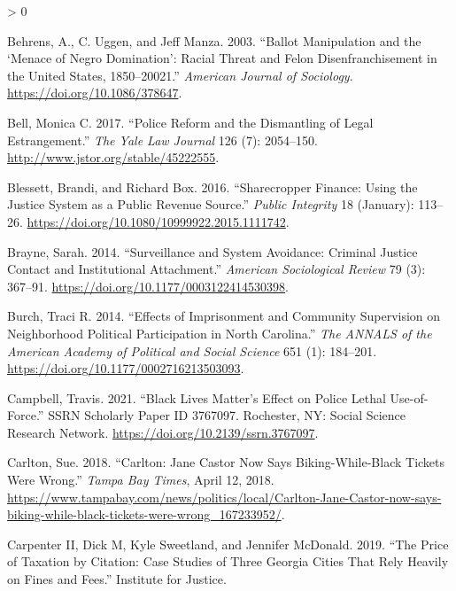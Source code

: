 \documentclass[
  12pt,
]{article}
\newlength{\cslhangindent}
\newenvironment{CSLReferences}[2] %
 {%
  \setlength{\parindent}{0pt}
  \ifodd #1 \everypar{\setlength{\hangindent}{\cslhangindent}}\ignorespaces\fi
  \ifnum #2 > 0
  \setlength{\parskip}{#2\baselineskip}
  \fi
 }%
 {}
\begin{document}
\hypertarget{refs}{}
\begin{CSLReferences}{1}{0}
\leavevmode\hypertarget{ref-Behrens2003}{}%
Behrens, A., C. Uggen, and Jeff Manza. 2003. {``Ballot {Manipulation} and the {`{Menace} of {Negro Domination}'}: {Racial Threat} and {Felon Disenfranchisement} in the {United States}, 1850--20021.''} \emph{American Journal of Sociology}. \url{https://doi.org/10.1086/378647}.

\leavevmode\hypertarget{ref-Bell2017}{}%
Bell, Monica C. 2017. {``Police {Reform} and the {Dismantling} of {Legal Estrangement}.''} \emph{The Yale Law Journal} 126 (7): 2054--150. \url{http://www.jstor.org/stable/45222555}.

\leavevmode\hypertarget{ref-Blessett2016}{}%
Blessett, Brandi, and Richard Box. 2016. {``Sharecropper {Finance}: {Using} the {Justice System} as a {Public Revenue Source}.''} \emph{Public Integrity} 18 (January): 113--26. \url{https://doi.org/10.1080/10999922.2015.1111742}.

\leavevmode\hypertarget{ref-Brayne2014}{}%
Brayne, Sarah. 2014. {``Surveillance and {System Avoidance}: {Criminal Justice Contact} and {Institutional Attachment}.''} \emph{American Sociological Review} 79 (3): 367--91. \url{https://doi.org/10.1177/0003122414530398}.

\leavevmode\hypertarget{ref-Burch2014}{}%
Burch, Traci R. 2014. {``Effects of {Imprisonment} and {Community Supervision} on {Neighborhood Political Participation} in {North Carolina}.''} \emph{The ANNALS of the American Academy of Political and Social Science} 651 (1): 184--201. \url{https://doi.org/10.1177/0002716213503093}.

\leavevmode\hypertarget{ref-Campbell2021}{}%
Campbell, Travis. 2021. {``Black {Lives Matter}'s {Effect} on {Police Lethal Use}-of-{Force}.''} SSRN Scholarly Paper ID 3767097. {Rochester, NY}: {Social Science Research Network}. \url{https://doi.org/10.2139/ssrn.3767097}.

\leavevmode\hypertarget{ref-Carlton2018}{}%
Carlton, Sue. 2018. {``Carlton: {Jane Castor} Now Says Biking-While-Black Tickets Were Wrong.''} \emph{Tampa Bay Times}, April 12, 2018. \url{https://www.tampabay.com/news/politics/local/Carlton-Jane-Castor-now-says-biking-while-black-tickets-were-wrong_167233952/}.

\leavevmode\hypertarget{ref-CarpenterII2019}{}%
Carpenter II, Dick M, Kyle Sweetland, and Jennifer McDonald. 2019. {``The {Price} of {Taxation} by {Citation}: {Case Studies} of {Three Georgia Cities That Rely Heavily} on {Fines} and {Fees}.''} {Institute for Justice}.


\end{CSLReferences}
\end{document}
